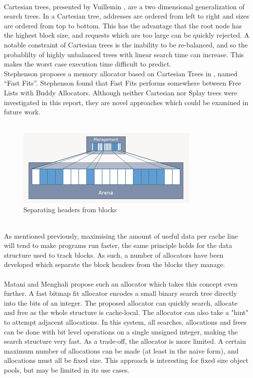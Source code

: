 \documentclass{article}
\begin{document}
\\
Cartesian trees, presented by Vuillemin \cite{10.1145/358841.358852}, are a two dimensional generalization of search trees. In a Cartesian tree, addresses are ordered from left to right and sizes are ordered from top to bottom. This has the advantage that the root node has the highest block size, and requests which are too large can be quickly rejected. A notable constraint of Cartesian trees is the inability to be re-balanced, and so the probablilty of highly unbalanced trees with linear search time can increase. This makes the worst case execution time difficult to predict.\\
Stephenson proposes a memory allocator based on Cartesian Trees in \cite{10.1145/800217.806613}, named ``Fast Fits''. Stephenson found that Fast Fits performs somewhere between Free Lists with Buddy Allocators. Although neither Cartesian nor Splay trees were investigated in this report, they are novel approaches which could be examined in future work.\\
\\
\begin{figure}[h]
	\centering
	\includegraphics[width=9cm]{arena_allocator}
	\captionsetup{width=10cm}
	\caption{Separating headers from blocks}
\end{figure}
\\
As mentioned previously, maximising the amount of useful data per cache line will tend to make programs run faster, the same principle holds for the data structure used to track blocks. As such, a number of allocators have been developed which separate the block headers from the blocks they manage.\\
\\
Matani and Menghali \cite{matani2021fastbitmapfitcpu} propose such an allocator which takes this concept even further. A fast bitmap fit allocator encodes a small binary search tree directly into the bits of an integer. The proposed allocator can quickly search, allocate and free as the whole structure is cache-local. The allocator can also take a "hint" to attempt adjacent allocations. In this system, all searches, allocations and frees can be done with bit level operations on a single unsigned integer, making the search structure very fast. As a trade-off, the allocator is more limited. A certain maximum number of allocations can be made (at least in the naive form), and allocations must all be fixed size. This approach is interesting for fixed size object pools, but may be limited in its use cases.\\
\end{document}
